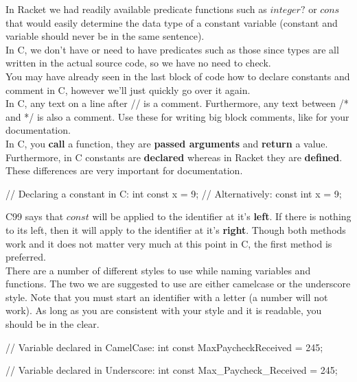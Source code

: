In Racket we had readily available predicate functions such as $integer?$ or $cons$ that would easily determine the data type of a constant variable (constant and variable should never be in the same sentence).\\

In C, we don't have or need to have predicates such as those since types are all written in the actual source code, so we have no need to check.\\

You may have already seen in the last block of code how to declare constants and comment in C, however we'll just quickly go over it again.\\

In C, any text on a line after // is a comment.  Furthermore, any text between /* and */ is also a comment.  Use these for writing big block comments, like for your documentation.\\

In C, you \textbf{call} a function, they are \textbf{passed arguments} and \textbf{return} a value.  Furthermore, in C constants are \textbf{declared} whereas in Racket they are \textbf{defined}.  These differences are very important for documentation.\\

\begin{code}[C]
// Declaring a constant in C:
int const x = 9;
// Alternatively:
const int x = 9;
\end{code}

C99 says that $const$ will be applied to the identifier at it's \textbf{left}.  If there is nothing to its left, then it will apply to the identifier at it's \textbf{right}.  Though both methods work and it does not matter very much at this point in C, the first method is preferred.\\

There are a number of different styles to use while naming variables and functions.  The two we are suggested to use are either camelcase or the underscore style.  Note that you must start an identifier with a letter (a number will not work).  As long as you are consistent with your style and it is readable, you should be in the clear.\\

\begin{code}[C]
// Variable declared in CamelCase:
int const MaxPaycheckReceived = 245;

// Variable declared in Underscore:
int const Max_Paycheck_Received = 245;
\end{code}


 